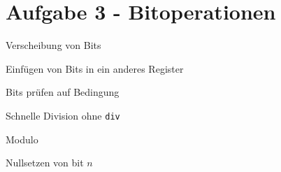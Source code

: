 \documentclass[
  german,            %
  aspectratio=169,    %
  sectionpage=false,   %
]{tumbeamer}
\begin{document}
\section{Aufgabe 3 - Bitoperationen}
\begin{frame}{Verscheibung von Bits}

\end{frame}
\begin{frame}{Einfügen von Bits in ein anderes Register}
\end{frame}
\begin{frame}{Bits prüfen auf Bedingung}
\end{frame}
\begin{frame}{Schnelle Division ohne \texttt{div}}
\end{frame}
\begin{frame}{Modulo}
\end{frame}
\begin{frame}{Nullsetzen von bit $n$}
\end{frame}
\end{document}
